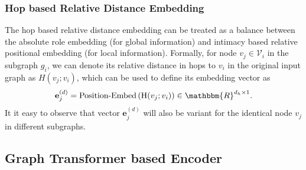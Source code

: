 \documentclass{article}
\newcommand{\mb}{\mathbf}
\newcommand{\mc}{\mathcal}
\begin{document}
\vspace{-3pt}
\subsubsection{Hop based Relative Distance Embedding}

The hop based relative distance embedding can be treated as a balance between the absolute role embedding (for global information) and intimacy based relative positional embedding (for local information). Formally, for node $v_j \in \mc{V}_i$ in the subgraph $g_i$, we can denote its relative distance in hops to $v_i$ in the original input graph as $H(v_j; v_i)$, which can be used to define its embedding vector as
\begin{equation}
{\mb{e}}_{j}^{(d)} = \mbox{Position-Embed} \left( \mbox{H}(v_j; v_i) \right) \in \mathbbm{R}^{d_h \times 1}.
\end{equation}
It it easy to observe that vector ${\mb{e}}_{j}^{(d)}$ will also be variant for the identical node $v_j$ in different subgraphs. 




\subsection{Graph Transformer based Encoder}
\end{document}
